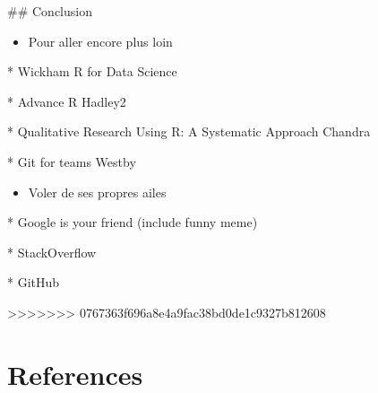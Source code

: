 \documentclass[
  letterpaper,
]{scrbook}
\providecommand{\tightlist}{%
  \setlength{\itemsep}{0pt}\setlength{\parskip}{0pt}}\usepackage{longtable,booktabs,array}
\begin{document}
\#\# Conclusion

\begin{itemize}
\tightlist
\item
  Pour aller encore plus loin
\end{itemize}

* Wickham R for Data Science

* Advance R Hadley2

* Qualitative Research Using R: A Systematic Approach Chandra

* Git for teams Westby

\begin{itemize}
\tightlist
\item
  Voler de ses propres ailes
\end{itemize}

* Google is your friend (include funny meme)

* StackOverflow

* GitHub

\textgreater\textgreater\textgreater\textgreater\textgreater\textgreater\textgreater{}
0767363f696a8e4a9fac38bd0de1c9327b812608


\hypertarget{references}{%
\chapter*{References}\label{references}}

\end{document}
